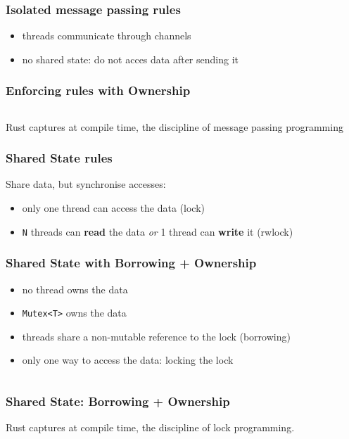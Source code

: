 \documentclass{beamer}
\begin{document}
\begin{frame}
    \frametitle{Isolated message passing rules}
    \begin{itemize}
        \item threads communicate through channels
        \item no shared state: do not acces data after sending it
    \end{itemize}
\end{frame}

\begin{frame}
    \frametitle{Enforcing rules with Ownership}
    \inputminted[fontsize=\tiny]{rust}{code/isolated_message_passing.rs}
\end{frame}

\begin{frame}
    Rust captures at compile time, the discipline of message passing programming
\end{frame}

\begin{frame}
    \frametitle{Shared State rules}
    Share data, but synchronise accesses:
    \begin{itemize}
        \item only one thread can access the data (lock)
        \item \texttt{N} threads can \textbf{read} the data \textit{or} 1 thread can \textbf{write} it (rwlock)
    \end{itemize}
\end{frame}

\begin{frame}
    \frametitle{Shared State with Borrowing + Ownership}
        \begin{itemize}
            \item no thread owns the data
            \item \texttt{Mutex<T>} owns the data
            \item threads share a non-mutable reference to the lock (borrowing)
            \item only one way to access the data: locking the lock
        \end{itemize}
        \vspace{1.5em}
        \inputminted{rust}{code/lock.rs}
\end{frame}

\begin{frame}
    \frametitle{Shared State: Borrowing + Ownership}
    Rust captures at compile time, the discipline of lock programming.
\end{frame}
\end{document}

